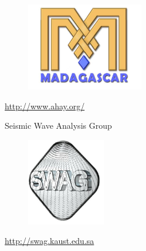 


\begin{frame}
  \begin{figure}
    \centering                                
    \includegraphics[height=1.5in]{Fig/MadLogo}
  \end{figure}
  \begin{center}                                
    \Large{\url{http://www.ahay.org/}}
  \end{center}
\end{frame}

\begin{frame}
  \begin{center}                                
    \Large{Seismic Wave Analysis Group}
  \end{center}
    \begin{figure}
    \centering
    \includegraphics[height=1.5in]{Fig/swag}
  \end{figure}
  \begin{center}                                
    \Large{\url{http://swag.kaust.edu.sa}}
  \end{center}
\end{frame}
